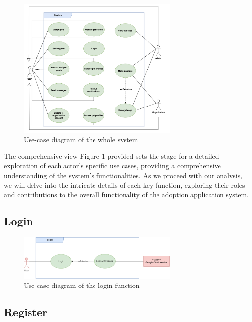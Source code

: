 \begin{figure}[H]
  \centering
  \includegraphics[width=0.7\textwidth]{Figures/system_ucd.png}
  \caption{Use-case diagram of the whole system}
  \label{fig:whole-system_activity_diagram}
\end{figure}

The comprehensive view Figure 1 provided sets the stage for a detailed exploration of each actor's specific use cases, providing a comprehensive understanding of the system's functionalities. As we proceed with our analysis, we will delve into the intricate details of each key function, exploring their roles and contributions to the overall functionality of the adoption application system.

\subsection{Login}

\begin{figure}[H]
  \centering
  \includegraphics[width=0.7\textwidth]{Figures/login_ucd.png}
  \caption{Use-case diagram of the login function}
  \label{fig:login_activity_diagram}
\end{figure}



\subsection{Register}


